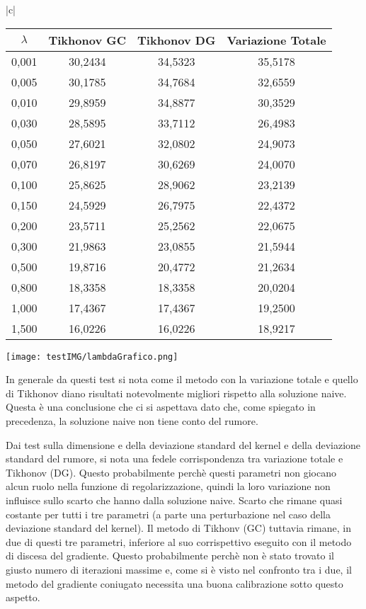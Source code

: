 \documentclass{article}
\begin{document}
\begin{center}
    
\begin{tabular}{ |c|}
\hline
{} \\
\hline
\begin{tabular}{c|c|c|c}
$\lambda$ &	Tikhonov GC &	Tikhonov DG & Variazione Totale \\
\hline
0,001 & 30,2434 & 34,5323 & 35,5178 \\
0,005 & 30,1785 & 34,7684 & 32,6559 \\
0,010 & 29,8959 & 34,8877 & 30,3529 \\
0,030 & 28,5895 & 33,7112 & 26,4983 \\
0,050 & 27,6021 & 32,0802 & 24,9073 \\
0,070 & 26,8197 & 30,6269 & 24,0070 \\
0,100 & 25,8625 & 28,9062 & 23,2139 \\
0,150 & 24,5929 & 26,7975 & 22,4372 \\
0,200 & 23,5711 & 25,2562 & 22,0675 \\
0,300 & 21,9863 & 23,0855 & 21,5944 \\
0,500 & 19,8716 & 20,4772 & 21,2634 \\
0,800 & 18,3358 & 18,3358 & 20,0204 \\
1,000 & 17,4367 & 17,4367 & 19,2500 \\
1,500 & 16,0226 & 16,0226 & 18,9217 \\
\hline
\end{tabular}
\end{tabular}


\end{center}

\hskip-2.5cm\texttt{[image: testIMG/lambdaGrafico.png]}

In generale da questi test si nota come il metodo con la variazione totale e quello di
Tikhonov diano risultati notevolmente migliori rispetto alla soluzione naive. Questa è una
conclusione che ci si aspettava dato che, come spiegato in precedenza, la soluzione naive
non tiene conto del rumore. 

Dai test sulla dimensione e della deviazione standard del kernel e della deviazione
standard del rumore, si nota una fedele corrispondenza tra variazione totale e Tikhonov
(DG). Questo probabilmente perchè questi parametri non giocano alcun ruolo nella funzione
di regolarizzazione, quindi la loro variazione non influisce sullo scarto che hanno 
dalla soluzione naive. Scarto che rimane quasi costante per tutti i tre parametri (a parte
una perturbazione nel caso della deviazione standard del kernel). Il metodo di Tikhonv
(GC) tuttavia rimane, in due di questi tre parametri, inferiore al suo corrispettivo
eseguito con il metodo di discesa del gradiente. Questo probabilmente perchè non è stato
trovato il giusto numero di iterazioni massime e, come si è visto nel confronto tra i due,
il metodo del gradiente coniugato necessita una buona calibrazione sotto questo aspetto.
\end{document}
